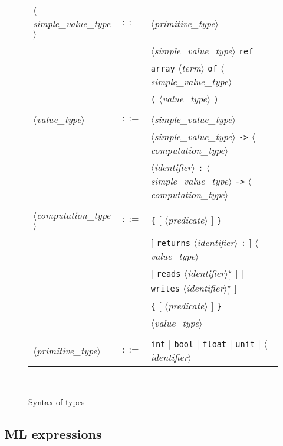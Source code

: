\documentclass[a4paper,12pt]{report}
\newcommand{\te}[1]{\texttt{#1}}
\newcommand{\nt}[1]{$\langle$\textsl{#1}$\rangle$}
\newcommand{\etoilesep}[1]{$^{\star}_#1$}
\begin{document}
\begin{figure}[htbp]
\begin{center}
\hrulefill\\
\begin{tabular}{lrl}
  \nt{simple\_value\_type}
    & $::=$ & \nt{primitive\_type} \\
      & $|$ & \nt{simple\_value\_type} \te{ref} \\
      & $|$ & \te{array} \nt{term} \te{of} \nt{simple\_value\_type} \\
      & $|$ & \te{(} \nt{value\_type} \te{)} \\
  \\[0.1em]

  \nt{value\_type}
    & $::=$ & \nt{simple\_value\_type} \\
      & $|$ & \nt{simple\_value\_type} \te{->} \nt{computation\_type} \\
      & $|$ & \nt{identifier} \te{:} \nt{simple\_value\_type} 
              \te{->} \nt{computation\_type} \\
  \\[0.1em]

  \nt{computation\_type}
    & $::=$ & \te{\{} $[$ \nt{predicate} $]$ \te{\}} \\
      &     & $[$ \te{returns} \nt{identifier} \te{:} $]$ \nt{value\_type} \\
      &     & $[$ \te{reads} \nt{identifier}\etoilesep{\te{,}} $]$
              $[$ \te{writes}  \nt{identifier}\etoilesep{\te{,}}  $]$ \\
      &     & \te{\{} $[$ \nt{predicate} $]$ \te{\}} \\
      & $|$ & \nt{value\_type} \\
  \\[0.1em]

  \nt{primitive\_type}
    & $::=$ & \te{int} $|$ \te{bool} $|$ \te{float} $|$ 
              \te{unit} $|$ \nt{identifier}
\end{tabular}\\
\hrulefill
\caption{Syntax of types}
\label{fig:types}
\end{center}            
\end{figure}

\subsection{ML expressions}
\end{document}

